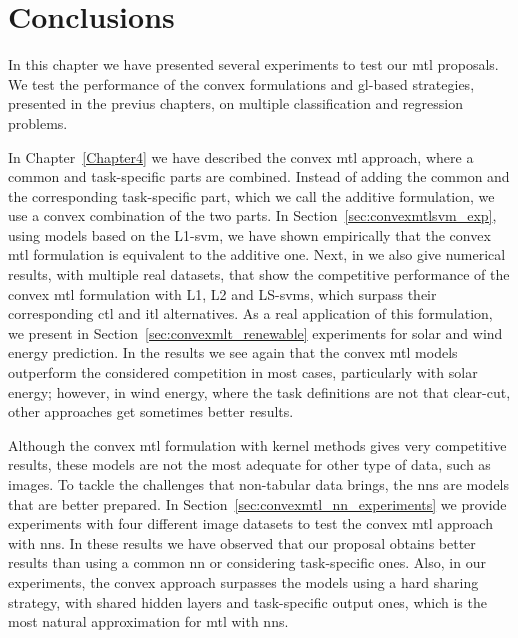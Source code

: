 \section{Conclusions} \label{seq-conclusions}

In this chapter we have presented several experiments to test our \acrshort{mtl} proposals. We test the performance of the convex formulations and \acrshort{gl}-based strategies, presented in the previus chapters, on multiple classification and regression problems.

In Chapter~\ref{Chapter4} we have described the convex \acrshort{mtl} approach, where a common and task-specific parts are combined. Instead of adding the common and the corresponding task-specific part, which we call the additive formulation, we use a convex combination of the two parts.
In Section~\ref{sec:convexmtlsvm_exp}, using models based on the L1-\acrshort{svm}, we have shown empirically that the convex \acrshort{mtl} formulation is equivalent to the additive one. 
Next, in we also give numerical results, with multiple real datasets, that show the competitive performance of the convex \acrshort{mtl} formulation with L1, L2 and LS-\acrshort{svms}, which surpass their corresponding \acrshort{ctl} and \acrshort{itl} alternatives.
As a real application of this formulation, we present in Section~\ref{sec:convexmlt_renewable} experiments for solar and wind energy prediction. In the results we see again that the convex \acrshort{mtl} models outperform the considered competition in most cases, particularly with solar energy; however, in wind energy, where the task definitions are not that clear-cut, other approaches get sometimes better results.

Although the convex \acrshort{mtl} formulation with kernel methods gives very competitive results, these models are not the most adequate for other type of data, such as images. To tackle the challenges that non-tabular data brings, the \acrshort{nns} are models that are better prepared. In Section~\ref{sec:convexmtl_nn_experiments} we provide experiments with four different image datasets to test the convex \acrshort{mtl} approach with \acrshort{nns}.
In these results we have observed that our proposal obtains better results than using a common \acrshort{nn} or considering task-specific ones. Also, in our experiments, the convex approach surpasses the models using a hard sharing strategy, with shared hidden layers and task-specific output ones, which is the most natural approximation for \acrshort{mtl} with \acrshort{nns}.

